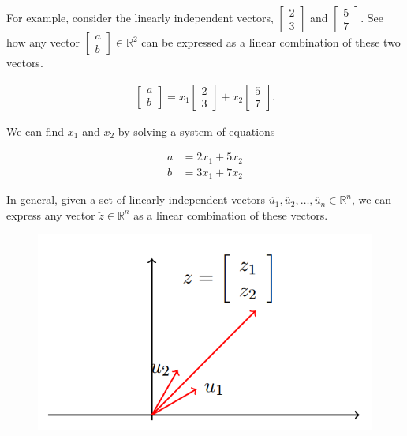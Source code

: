 \documentclass[11pt, a4paper]{article}
\newcommand{\colvec}[2]{\begin{bmatrix} #1 \\ #2 \end{bmatrix}}
\begin{document}
For example, consider the linearly independent vectors, $\colvec{2}{3}$ and $\colvec{5}{7}$. See how any vector $\colvec{a}{b} \in \mathbb{R}^2$ can be expressed as a linear combination of these two vectors.

\begin{gather*}
\colvec{a}{b} = x_1 \colvec{2}{3} + x_2 \colvec{5}{7}.
\end{gather*}

We can find $x_1$ and $x_2$ by solving a system of equations

\begin{align*}
a &= 2x_1 + 5x_2 \\
b &= 3x_1 + 7x_2
\end{align*}

\newpage

In general, given a set of linearly independent vectors $\utilde{u_1}, \utilde{u_2}, \ldots, \utilde{u_n} \in \mathbb{R}^n$, we can express any vector $\utilde{z} \in \mathbb{R}^n$ as a linear combination of these
vectors.

\begin{figure}[!htbp]

\centering

\includegraphics[scale=0.5]{image_4.png}

\end{figure}
\end{document}
